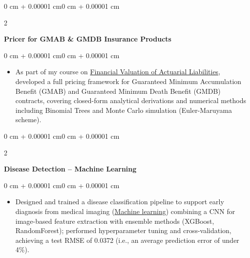 \documentclass[10pt, letterpaper]{article}
\newenvironment{highlights}{
    \begin{itemize}[
        topsep=0.06 cm,
        parsep=0.06 cm,
        partopsep=0pt,
        itemsep=0pt,
        leftmargin=0 cm + 10pt
    ]
}{
    \end{itemize}
}
\newenvironment{onecolentry}{
    \begin{adjustwidth}{0 cm + 0.00001 cm}{0 cm + 0.00001 cm}
}{
    \end{adjustwidth}
}
\newenvironment{twocolentry}[2][]{
    \onecolentry
    \def\secondColumn{#2}
    \setcolumnwidth{\fill, 4.5 cm}
    \begin{paracol}{2}
}{
    \switchcolumn \raggedleft \secondColumn
    \end{paracol}
    \endonecolentry
}
\begin{document}
        \begin{twocolentry}{}
            \textbf{Pricer for GMAB \& GMDB Insurance Products}
        \end{twocolentry}
        \vspace{0.06 cm}
        \begin{onecolentry}
            \begin{highlights}
                \item As part of my course on \href{https://uclouvain.be/cours-2026-LACTU2170}{Financial Valuation of Actuarial Liabilities}, developed a full pricing framework for Guaranteed Minimum Accumulation Benefit (GMAB) and Guaranteed Minimum Death Benefit (GMDB) contracts, covering closed-form analytical derivations and numerical methods including Binomial Trees and Monte Carlo simulation (Euler-Maruyama scheme).
            \end{highlights}
        \end{onecolentry}

        \vspace{0.06 cm}

        \begin{twocolentry}{}
            \textbf{Disease Detection -- Machine Learning}
        \end{twocolentry}
        \vspace{0.06 cm}
        \begin{onecolentry}
            \begin{highlights}
                \item Designed and trained a disease classification pipeline to support early diagnosis from medical imaging  (\href{https://uclouvain.be/cours-2025-lelec2870}{Machine learning}) combining a CNN for image-based feature extraction with ensemble methods (XGBoost, RandomForest); performed hyperparameter tuning and cross-validation, achieving a test RMSE of 0.0372 (i.e., an average prediction error of under 4\%).                %
            \end{highlights}
        \end{onecolentry}

        \vspace{0.06 cm}
\end{document}
